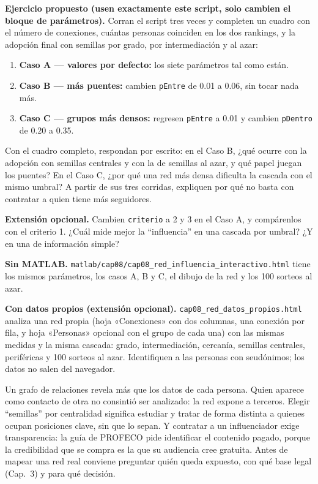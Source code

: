\begin{cajaLaboratorio}
\textbf{Ejercicio propuesto (usen exactamente este script, solo cambien el
bloque de parámetros).} Corran el script tres veces y completen un cuadro con
el número de conexiones, cuántas personas coinciden en los dos rankings, y
la adopción final con semillas por grado, por intermediación y al azar:
\begin{enumerate}
  \item \textbf{Caso A — valores por defecto:} los siete parámetros tal como
  están.
  \item \textbf{Caso B — más puentes:} cambien \texttt{pEntre} de 0.01 a
  0.06, sin tocar nada más.
  \item \textbf{Caso C — grupos más densos:} regresen \texttt{pEntre} a 0.01
  y cambien \texttt{pDentro} de 0.20 a 0.35.
\end{enumerate}
Con el cuadro completo, respondan por escrito: en el Caso B, ¿qué ocurre con
la adopción con semillas centrales y con la de semillas al azar, y qué papel
juegan los puentes? En el Caso C, ¿por qué una red más densa dificulta la
cascada con el mismo umbral? A partir de sus tres corridas, expliquen por qué
no basta con contratar a quien tiene más seguidores.

\textbf{Extensión opcional.} Cambien \texttt{criterio} a 2 y 3 en el Caso A,
y compárenlos con el criterio 1. ¿Cuál mide mejor la \enquote{influencia} en
una cascada por umbral? ¿Y en una de información simple?

\textbf{Sin MATLAB.}
\texttt{matlab/cap08/cap08\_red\_influencia\_interactivo.html} tiene los mismos
parámetros, los casos A, B y C, el dibujo de la red y los 100 sorteos al
azar.

\textbf{Con datos propios (extensión opcional).}
\texttt{cap08\_red\_datos\_propios.html}
analiza una red propia (hoja «Conexiones» con dos columnas, una conexión por fila, y hoja «Personas» opcional con el grupo de cada una) con las mismas medidas y la misma cascada: grado, intermediación, cercanía, semillas centrales, periféricas y 100 sorteos al azar. Identifiquen a las personas con seudónimos; los datos no salen del navegador.
\end{cajaLaboratorio}

\begin{cajaEtica}
Un grafo de relaciones revela más que los datos de cada persona. Quien
aparece como contacto de otra no consintió ser analizado: la red expone a
terceros. Elegir \enquote{semillas} por centralidad significa estudiar y
tratar de forma distinta a quienes ocupan posiciones clave, sin que
lo sepan. Y contratar a un influenciador exige transparencia: la guía de
PROFECO \parencite{profeco2023influencers} pide identificar el contenido
pagado, porque la credibilidad que se compra es la que su audiencia cree
gratuita. Antes de mapear una red real conviene preguntar quién queda
expuesto, con qué base legal (Cap.~3) y para qué decisión.
\end{cajaEtica}

